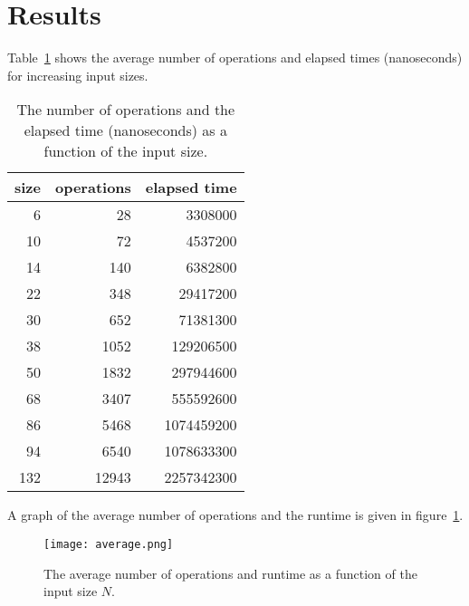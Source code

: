 \section{Results}

Table~\ref{t:time} shows the average number of operations and elapsed
times (nanoseconds) for increasing input sizes.

\begin{table}[H]	%
	\centering	%
	\caption{
		The number of operations and the elapsed time (nanoseconds)
		as a function of the input size.
	}	%

	\begin{tabular}{r r r}
		size & operations & elapsed time \\
		\hline
		6& 28& 3308000\\
        	10& 72& 4537200\\
       		14& 140& 6382800\\
        	22& 348& 29417200\\
        	30& 652& 71381300\\
        	38& 1052& 129206500\\
        	50& 1832& 297944600\\
        	68& 3407& 555592600\\
        	86& 5468& 1074459200\\
        	94& 6540& 1078633300\\
        	132& 12943& 2257342300
	\end{tabular}

	\label{t:time}
\end{table}


A graph of the average number of operations and the runtime is given in
figure~\ref{fig:best}.

\begin{figure}[H]
	\centering
	\texttt{[image: average.png]}
    \caption{
		The average number of operations and runtime as a function of the input size $N$.
	} 
    
	\label{fig:best}
\end{figure}
